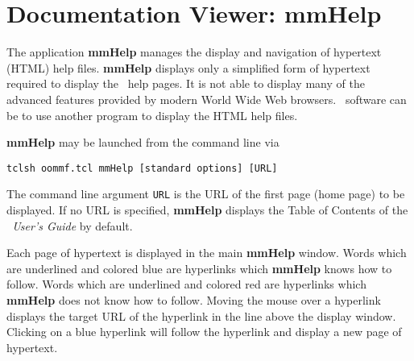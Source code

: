 \section{Documentation Viewer: mmHelp}\label{sec:mmhelp}

\begin{center}
\end{center}

The application {\bf mmHelp} manages the display and navigation of
hypertext (HTML) help files.  
%
{\bf mmHelp} displays only a simplified form of hypertext
required to display the \OOMMF\ help pages.
It is not able to display many of
the advanced features provided by modern World Wide Web
browsers.  
\OOMMF\ software can be  to use another program to display the HTML help
files.

{\bf mmHelp} may be launched from the command line via
\begin{verbatim}
tclsh oommf.tcl mmHelp [standard options] [URL]
\end{verbatim}
The command line argument {\tt URL} is the URL of the first
page (home page) to be displayed.  If no URL is specified,
{\bf mmHelp} displays the Table of Contents of the {\em \OOMMF\ User's
Guide} by default.

Each page of hypertext is displayed in the main {\bf mmHelp} window.
Words which are underlined and colored blue are hyperlinks which {\bf
mmHelp} knows how to follow.  Words which are underlined and colored red
are hyperlinks which {\bf mmHelp} does not know how to follow.  Moving
the mouse over a hyperlink displays the target URL of the hyperlink in
the  line above the display window.  Clicking on a blue
hyperlink will follow the hyperlink and display a new page of hypertext.

